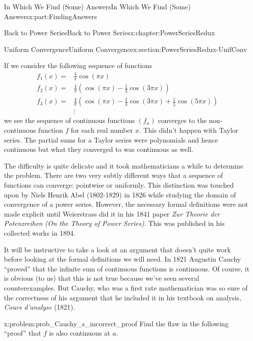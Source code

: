 \documentclass[oneside,10pt,]{book}
\numberwithin{equation}{section}
\newcommand{\amp}{&}
\begin{document}
\begin{partptx}{In Which We Find (Some) Answers}{}{In Which We Find (Some) Answers}{}{}{x:part:FindingAnswers}
\begin{chapterptx}{Back to Power Series}{}{Back to Power Series}{}{}{x:chapter:PowerSeriesRedux}
\begin{sectionptx}{Uniform Convergence}{}{Uniform Convergence}{}{}{x:section:PowerSeriesRedux-UnifConv}
\begin{image}{0.075}{0.85}{0.075}
\end{image}%
If we consider the following sequence of functions%
\begin{align*}
f_1(x)=\amp \frac{4}{\pi}\cos\left(\pi x\right)\\
f_2(x)=\amp \frac{4}{\pi}\left(\cos \left(\pi x\right)-\frac{1}{3}\cos\left( 3\pi x\right)\right)\\
f_3(x)=\amp \frac{4}{\pi}\left(\cos\left(\pi x\right)-\frac{1}{3}\cos\left(3\pi x\right)+\frac{1}{5}\cos\left(5\pi x\right)\right)\\
\amp \vdots
\end{align*}
we see the sequence of continuous functions \(\left(f_n\right)\) converges to the non-continuous function \(f\) for each real number \(x\). This didn't happen with Taylor series. The partial sums for a Taylor series were polynomials and hence continuous but what they converged to was continuous as well.%
\par
The difficulty is quite delicate and it took mathematicians a while to determine the problem. There are two very subtly different ways that a sequence of functions can converge: pointwise or uniformly. This  distinction was touched upon by Niels Henrik Abel (1802-1829) in 1826 while studying the domain of convergence of a power series. However, the necessary formal definitions were not made explicit until Weierstrass  did it in his 1841 paper \textit{Zur Theorie der Potenzreihen} \emph{(On the Theory of Power Series)}. This was published in his collected works in 1894.%
\par
It will be instructive to take a look at an argument that doesn't quite work before looking at the formal definitions we will need. In 1821 Augustin Cauchy  ``proved'' that the infinite sum of continuous functions is continuous. Of course, it is obvious (to us) that this is not true because we've seen several counterexamples. But Cauchy, who was a first rate mathematician was so sure of the correctness of his argument that he included it in his textbook on analysis, \textit{Cours d'analyse} (1821).%
\begin{problem}{}{x:problem:prob_Cauchy_s_incorrect_proof}%
 Find the flaw in the following ``proof'' that \(f\) is also continuous at \(a\).%
\par

\end{problem}
\end{sectionptx}
\end{chapterptx}
\end{partptx}
\end{document}
